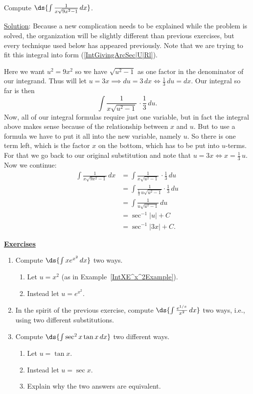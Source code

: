 \bex Compute $\ds{\int\frac1{x\sqrt{9x^2-1}}\,dx}$.

\underline{Solution}: Because a new complication needs to be explained
while the problem is solved, the organization will be slightly different
than previous exercises, but every technique used below has appeared
previously. Note that we are trying to fit this integral into
form (\ref{IntGivingArcSec|U|Rl}).

Here we want $u^2=9x^2$ so we have $\sqrt{u^2-1}$ as one factor in
the denominator of our integrand.  Thus will let 
$u=3x\implies du=3\,dx\iff\frac13\,du=dx$.  Our integral so far is then
$$\int\frac1{x\sqrt{u^2-1}}\,\cdot\frac13\,du.$$
Now, all of our integral formulas require just one variable, but
in fact the integral above makes sense because of the relationship 
between $x$ and $u$.  But to use a formula we have to put it all into the
new variable, namely $u$.  So there is one term left, which is the 
factor $x$ on the bottom, which has to be put into $u$-terms.
For that we go back to our original substitution and note that
$u=3x\iff x=\frac13\,u$.  Now we continue:
\begin{align*}
\int\frac1{x\sqrt{9x^2-1}}\,dx&=\int\frac1{x\sqrt{u^2-1}}\,\cdot\frac13\,du\\
 &=\int\frac1{\frac13\,u\sqrt{u^2-1}}\cdot\frac13\,du\\
 &=\int\frac1{u\sqrt{u^2-1}}\,du\\
 &=\sec^{-1}|u|+C\\
 &=\sec^{-1}|3x|+C.\end{align*}
\label{FirstWackySecantU-SubProblem}\eex


\newpage
\begin{center}
\underline{\Large{\bf Exercises}}\end{center}
\bigskip
\begin{multicols}{2}
\begin{enumerate}
\item Compute $\ds{\int x e^{x^2}\,dx}$ two ways.
 \begin{enumerate}
 \item Let $u=x^2$ (as in Example~\ref{IntXE^x^2Example}).
 \item Instead let $u=e^{x^2}$.
 \end{enumerate}
\item In the spirit of the previous exercise,
      compute $\ds{\int\frac{e^{1/x}}{x^2}\,dx}$
      two ways, i.e., using two different substitutions.
\item Compute $\ds{\int\sec^2x\tan x\,dx}$
      two different ways.
 \begin{enumerate}
 \item Let $u=\tan x$.
 \item Instead let $u=\sec x$.
 \item Explain why the two answers are equivalent.
 \end{enumerate}
\end{enumerate}\end{multicols}


